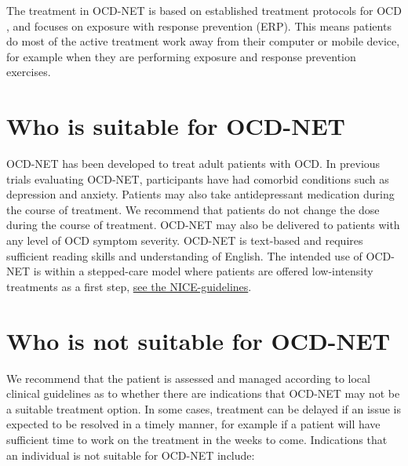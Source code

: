 \documentclass[]{book}
\begin{document}
The treatment in OCD-NET is based on established treatment protocols for OCD \citep{foa2012}, and focuses on exposure with response prevention (ERP). This means patients do most of the active treatment work away from their computer or mobile device, for example when they are performing exposure and response prevention exercises.

\hypertarget{who-is-suitable-for-ocd-net}{%
\section{Who is suitable for OCD-NET}\label{who-is-suitable-for-ocd-net}}

OCD-NET has been developed to treat adult patients with OCD. In previous trials evaluating OCD-NET, participants have had comorbid conditions such as depression and anxiety. Patients may also take antidepressant medication during the course of treatment. We recommend that patients do not change the dose during the course of treatment. OCD-NET may also be delivered to patients with any level of OCD symptom severity. OCD-NET is text-based and requires sufficient reading skills and understanding of English. The intended use of OCD-NET is within a stepped-care model where patients are offered low-intensity treatments as a first step, \href{https://www.nice.org.uk/guidance/CG31/chapter/1-Guidance\#steps-35-treatment-options-for-people-with-ocd-or-bdd}{see the NICE-guidelines}.

\hypertarget{who-is-not-suitable-for-ocd-net}{%
\section{Who is not suitable for OCD-NET}\label{who-is-not-suitable-for-ocd-net}}

We recommend that the patient is assessed and managed according to local clinical guidelines as to whether there are indications that OCD-NET may not be a suitable treatment option. In some cases, treatment can be delayed if an issue is expected to be resolved in a timely manner, for example if a patient will have sufficient time to work on the treatment in the weeks to come. Indications that an individual is not suitable for OCD-NET include:
\end{document}
